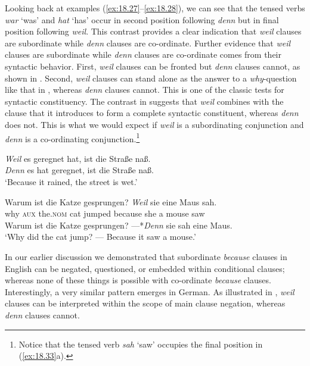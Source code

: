 Looking back at examples (\ref{ex:18.27}--\ref{ex:18.28}), we can see that the tensed verbs \textit{war} ‘was’ and \textit{hat} ‘has’ occur in second position following \textit{denn} but in final position following \textit{weil}. This contrast provides a clear indication that \textit{weil} clauses are subordinate while \textit{denn} clauses are co-ordinate. Further evidence that \textit{weil} clauses are subordinate while \textit{denn} clauses are co-ordinate comes from their syntactic behavior. First, \textit{weil} clauses can be fronted but \textit{denn} clauses cannot, as shown in . Second, \textit{weil} clauses can stand alone as the answer to a \textit{why}-question like that in , whereas \textit{denn} clauses cannot. This is one of the classic tests for syntactic constituency. The contrast in  suggests that \textit{weil} combines with the clause that it introduces to form a complete syntactic constituent, whereas \textit{denn} does not. This is what we would expect if \textit{weil} is a subordinating conjunction and \textit{denn} is a co-ordinating conjunction.\footnote{Notice that the tensed verb \textit{sah} ‘saw’ occupies the final position in (\ref{ex:18.33}a).}


\ea \label{ex:18.32}
\ea  \textit{Weil} es geregnet hat, ist die Straße naß.\\
\ex *\textit{Denn} es hat geregnet, ist die Straße naß.\\
\glt ‘Because it rained, the street is wet.’
\z \z

\ea \label{ex:18.33}
\ea  \gll Warum  ist  die  Katze  gesprungen?  \textit{Weil}  sie  eine  Maus  sah.\\
why  \textsc{aux}  the.\textsc{nom}  cat  jumped  because  she  a  mouse  saw\\
\ex  Warum ist die Katze gesprungen? —*\textit{Denn} sie sah eine Maus.\\
\glt ‘Why did the cat jump? — Because it saw a mouse.’
\z \z


In our earlier discussion we demonstrated that subordinate \textit{because} clauses in English can be negated, questioned, or embedded within conditional clauses; whereas none of these things is possible with co-ordinate \textit{because} clauses. Interestingly, a very similar pattern emerges in German. As illustrated in , \textit{weil} clauses can be interpreted within the scope of main clause negation, whereas \textit{denn} clauses cannot.


